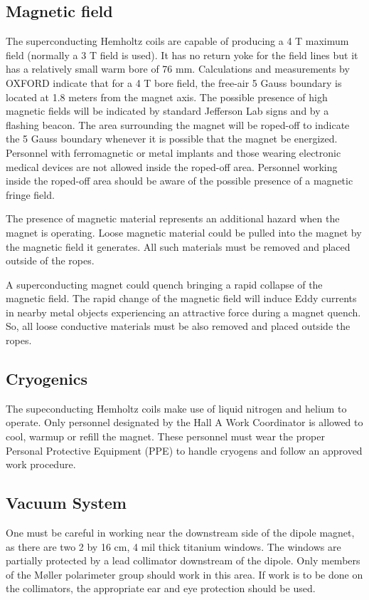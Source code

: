 \begin{safetyen}{0}{0}
\subsection{Magnetic field}
The superconducting Hemholtz coils are capable of producing a 4 T maximum field (normally a 3 T field
is used). It has no return yoke for the field lines but it has a relatively small warm bore of 76 mm.
Calculations and measurements by OXFORD indicate that for a 4 T bore field,
the free-air 5 Gauss boundary is located at 1.8 meters
from the magnet axis.
The possible presence of high magnetic fields will be indicated by
standard Jefferson Lab signs and by a flashing beacon. The area surrounding 
the magnet will be roped-off to indicate the 5 Gauss boundary
whenever it is possible that the magnet be 
energized.
Personnel with ferromagnetic or metal implants and those 
wearing electronic medical devices are not allowed inside the roped-off area. 
Personnel working inside the roped-off area 
should be aware of the possible presence of a magnetic fringe field.

The presence of magnetic material
represents an additional hazard when the magnet is operating.
Loose magnetic material could be pulled into the magnet by the magnetic field it generates.
All such materials must 
be removed and placed outside of the ropes.

A superconducting magnet could quench bringing a rapid collapse of the magnetic field.
The rapid change of the magnetic field will induce Eddy currents in nearby metal objects
experiencing an attractive force during a magnet quench. So, all loose conductive materials
must be also removed and placed outside the ropes.

\subsection{Cryogenics}
The supeconducting Hemholtz coils make use of liquid nitrogen and helium to operate.
 Only personnel designated by the Hall A Work Coordinator is allowed to cool, warmup
 or refill the magnet. These personnel must wear the proper Personal Protective Equipment (PPE) to handle cryogens and follow
 an approved work procedure.

\subsection{Vacuum System}

One must be careful in working near the downstream side of the dipole
magnet, as there are two 2 by 16 cm, 4 mil thick titanium windows.
The windows are partially protected by a lead collimator downstream
of the dipole. 
Only members of the M{\o}ller polarimeter group should work in this
area. 
If work is to be done on the collimators, the appropriate ear
and eye protection should be used.


\end{safetyen}
